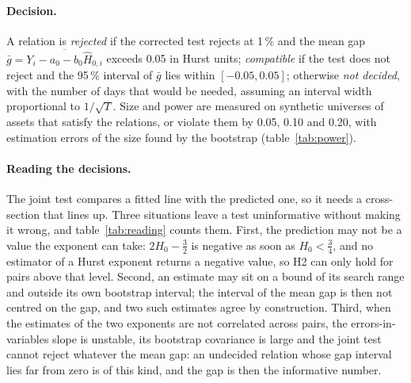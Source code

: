\documentclass[11pt]{article}
\newcommand{\Hz}{H_0}
\begin{document}
\paragraph{Decision.} A relation is \emph{rejected} if the corrected test rejects at 1\,\%
and the mean gap $\bar g=\overline{Y_i-a_0-b_0\hat H_{0,i}}$ exceeds 0.05 in Hurst units;
\emph{compatible} if the test does not reject and the 95\,\% interval of $\bar g$ lies
within $[-0.05,0.05]$; otherwise \emph{not decided}, with the number of days that would be
needed, assuming an interval width proportional to $1/\sqrt{T}$. Size and power are
measured on synthetic universes of assets that satisfy the relations, or violate them by
0.05, 0.10 and 0.20, with estimation errors of the size found by the bootstrap
(table~\ref{tab:power}).

\paragraph{Reading the decisions.} The joint test compares a fitted line with the
predicted one, so it needs a cross-section that lines up. Three situations leave a test
uninformative without making it wrong, and table~\ref{tab:reading} counts them. First,
the prediction may not be a value the exponent can take: $2\Hz-\tfrac32$ is negative as
soon as $\Hz<\tfrac34$, and no estimator of a Hurst exponent returns a negative value, so
H2 can only hold for pairs above that level. Second, an estimate may sit on a bound of
its search range and outside its own bootstrap interval; the interval of the mean gap is
then not centred on the gap, and two such estimates agree by construction. Third, when
the estimates of the two exponents are not correlated across pairs, the
errors-in-variables slope is unstable, its bootstrap covariance is large and the joint
test cannot reject whatever the mean gap: an undecided relation whose gap interval lies
far from zero is of this kind, and the gap is then the informative number.
\end{document}

